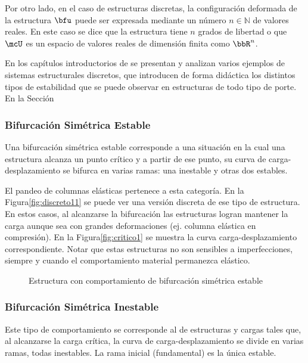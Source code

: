 Por otro lado, en el caso de estructuras discretas, la configuración deformada de la estructura $\bfu$ puede ser expresada mediante un número $n\in\mathbb{N}$ de valores reales. En este caso se dice que la estructura tiene $n$ grados de libertad o que $\mcU$ es un espacio de valores reales de dimensión finita como $\bbR^n$.

En los capítulos introductorios de \citep{Bazzano2017} se presentan y analizan varios ejemplos de sistemas estructurales discretos, que introducen de forma didáctica los distintos tipos de estabilidad que se puede observar en estructuras de todo tipo de porte. En la Sección~




\subsubsection{Bifurcación Simétrica Estable}

Una bifurcación simétrica estable corresponde a una situación en la cual una estructura alcanza un punto crítico y a partir de ese punto, su curva de carga-desplazamiento se bifurca en varias ramas: una inestable y otras dos estables.

El pandeo de columnas elásticas pertenece a esta categoría. En la Figura\autoref{fig:discreto11} se puede ver una versión discreta de ese tipo de estructura. En estos casos, al alcanzarse la bifurcación las estructuras logran mantener la carga aunque sea con grandes deformaciones (ej. columna elástica en compresión). En la Figura\autoref{fig:critico1} se muestra la curva carga-desplazamiento correspondiente. Notar que estas estructuras no son sensibles a imperfecciones, siempre y cuando el comportamiento material permanezca elástico.
\begin{figure}[htb]
	\centering
	\hspace{1em}
	\caption{Estructura con comportamiento de bifurcación simétrica estable}
	\label{fig:simetrica1}
\end{figure}

\subsubsection{Bifurcación Simétrica Inestable}

Este tipo de comportamiento se corresponde al de estructuras y cargas tales que, al alcanzarse la carga crítica, la curva de carga-desplazamiento se divide en varias ramas, todas inestables. La rama inicial (fundamental) es la única estable.

